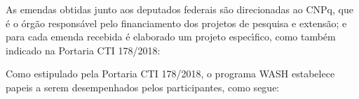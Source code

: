 \documentclass[
12pt,		%
openright,	%
twoside,  %
a4paper,			%
chapter=TITLE,		%
english,			%
french,				%
spanish,			%
brazil				%
]{USPSC-classe/USPSC}
\begin{document}
As emendas obtidas junto aos deputados federais s\~ao direcionadas ao CNPq, que \'e o \'org\~ao respons\'avel pelo financiamento dos projetos de pesquisa e extens\~ao;  e para cada emenda recebida \'e elaborado um projeto espec\'{\i}fico, como tamb\'em indicado na Portaria CTI 178/2018:


















\noindent\begin{center}\mbox{\centering{}}\end{center}


Como estipulado pela Portaria CTI 178/2018, o programa WASH estabelece papeis a serem desempenhados pelos participantes, como segue:
\end{document}
